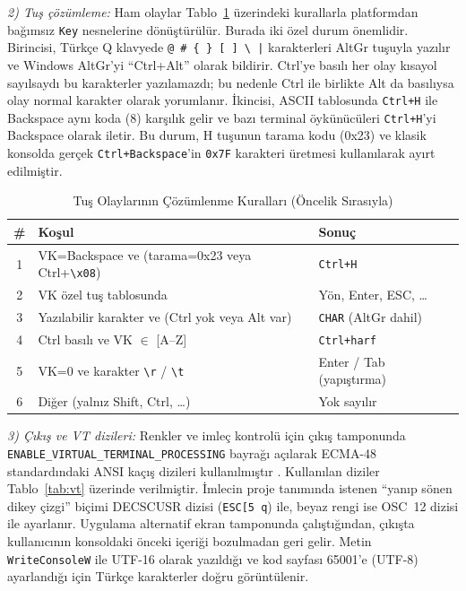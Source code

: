 \documentclass[conference,a4paper]{IEEEtran}
\newcommand{\kod}[1]{\texttt{#1}}
\begin{document}
\textit{2) Tuş çözümleme:} Ham olaylar Tablo~\ref{tab:tus} üzerindeki kurallarla platformdan bağımsız \kod{Key} nesnelerine dönüştürülür. Burada iki özel durum önemlidir. Birincisi, Türkçe Q klavyede \kod{@ \# \{ \} [ ] \textbackslash\ |} karakterleri AltGr tuşuyla yazılır ve Windows AltGr'yi ``Ctrl+Alt'' olarak bildirir. Ctrl'ye basılı her olay kısayol sayılsaydı bu karakterler yazılamazdı; bu nedenle Ctrl ile birlikte Alt da basılıysa olay normal karakter olarak yorumlanır. İkincisi, ASCII tablosunda \kod{Ctrl+H} ile Backspace aynı koda (8) karşılık gelir ve bazı terminal öykünücüleri \kod{Ctrl+H}'yi Backspace olarak iletir. Bu durum, H tuşunun tarama kodu (0x23) ve klasik konsolda gerçek \kod{Ctrl+Backspace}'in \kod{0x7F} karakteri üretmesi kullanılarak ayırt edilmiştir.

\begin{table}[t]
\centering
\caption{Tuş Olaylarının Çözümlenme Kuralları (Öncelik Sırasıyla)}
\label{tab:tus}
\begin{tabular}{@{}cp{3.6cm}p{2.9cm}@{}}
\toprule
\textbf{\#} & \textbf{Koşul} & \textbf{Sonuç} \\
\midrule
1 & VK=Backspace ve (tarama=0x23 veya Ctrl+\kod{\textbackslash x08}) & \kod{Ctrl+H} \\
2 & VK özel tuş tablosunda & Yön, Enter, ESC, \ldots \\
3 & Yazılabilir karakter ve (Ctrl yok veya Alt var) & \kod{CHAR} (AltGr dahil) \\
4 & Ctrl basılı ve VK $\in$ [A--Z] & \kod{Ctrl+harf} \\
5 & VK=0 ve karakter \kod{\textbackslash r} / \kod{\textbackslash t} & Enter / Tab (yapıştırma) \\
6 & Diğer (yalnız Shift, Ctrl, \ldots) & Yok sayılır \\
\bottomrule
\end{tabular}
\end{table}

\textit{3) Çıkış ve VT dizileri:} Renkler ve imleç kontrolü için çıkış tamponunda \kod{ENABLE\_VIRTUAL\_TERMINAL\_PROCESSING} bayrağı açılarak ECMA-48 standardındaki ANSI kaçış dizileri kullanılmıştır \cite{ecma48,msvt}. Kullanılan diziler Tablo~\ref{tab:vt} üzerinde verilmiştir. İmlecin proje tanımında istenen ``yanıp sönen dikey çizgi'' biçimi DECSCUSR dizisi (\kod{ESC[5~q}) ile, beyaz rengi ise OSC~12 dizisi ile ayarlanır. Uygulama alternatif ekran tamponunda çalıştığından, çıkışta kullanıcının konsoldaki önceki içeriği bozulmadan geri gelir. Metin \kod{WriteConsoleW} ile UTF-16 olarak yazıldığı ve kod sayfası 65001'e (UTF-8) ayarlandığı için Türkçe karakterler doğru görüntülenir.
\end{document}
